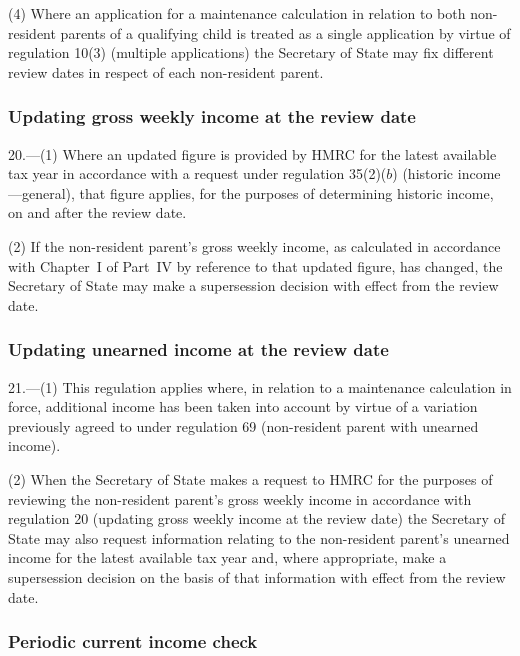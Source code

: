\documentclass[12pt,a4paper]{article}
\begin{document}
(4) Where an application for a maintenance calculation in relation to both non-resident parents of a qualifying child is treated as a single application by virtue of regulation 10(3) (multiple applications) the Secretary of State may fix different review dates in respect of each non-resident parent.

\subsubsection[20. Updating gross weekly income at the review date]{Updating gross weekly income at the review date}

20.---(1)  Where an updated figure is provided by HMRC for the latest available tax year in accordance with a request under regulation 35(2)($b$)  (historic income---general), that figure applies, for the purposes of determining historic income, on and after the review date.

(2) If the non-resident parent’s gross weekly income, as calculated in accordance with Chapter~I of Part~IV by reference to that updated figure, has changed, the Secretary of State may make a supersession decision with effect from the review date.

\subsubsection[21. Updating unearned income at the review date]{Updating unearned income at the review date}

21.---(1)  This regulation applies where, in relation to a maintenance calculation in force, additional income has been taken into account by virtue of a variation previously agreed to under regulation 69 (non-resident parent with unearned income).

(2) When the Secretary of State makes a request to HMRC for the purposes of reviewing the non-resident parent’s gross weekly income in accordance with regulation 20 (updating gross weekly income at the review date) the Secretary of State may also request information relating to the non-resident parent’s unearned income for the latest available tax year and, where appropriate, make a supersession decision on the basis of that information with effect from the review date.

\subsubsection[22. Periodic current income check]{Periodic current income check}
\end{document}
